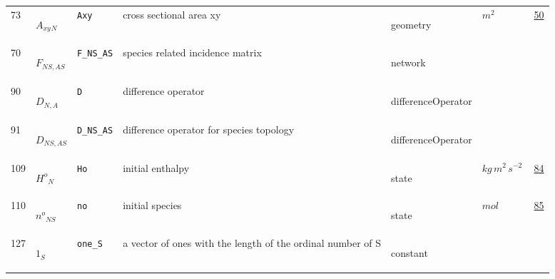 \begin{longtable}{|p{1cm}|p{2.5cm}|p{4.5cm}|p{8cm}|p{3.0cm}|p{3cm}|p{1cm}|}
            73
             & \hypertarget{"v:73"}{ $ {{A_{xy}}}{_{N}} $}
             & \verb|Axy|
             & cross sectional area xy
             & \begin{lay}geometry \end{lay}
             & $ m^{2} \, $
             &                 \hyperlink{"e:50"}{ 50 }
                 \\
            70
             & \hypertarget{"v:70"}{ $ {F}{_{{N S}, {A S}}} $}
             & \verb|F_NS_AS|
             & species related incidence matrix
             & \begin{lay}network \end{lay}
             & $  $
             & \\
            90
             & \hypertarget{"v:90"}{ $ {D}{_{N, A}} $}
             & \verb|D|
             & difference operator
             & \begin{lay}differenceOperator \end{lay}
             & $  $
             & \\
            91
             & \hypertarget{"v:91"}{ $ {D}{_{{N S}, {A S}}} $}
             & \verb|D_NS_AS|
             & difference operator for species topology
             & \begin{lay}differenceOperator \end{lay}
             & $  $
             & \\
            109
             & \hypertarget{"v:109"}{ $ {{H^o}}{_{N}} $}
             & \verb|Ho|
             & initial enthalpy
             & \begin{lay}state \end{lay}
             & $ kg \,m^{2} \,s^{-2} \, $
             &                 \hyperlink{"e:84"}{ 84 }
                 \\
            110
             & \hypertarget{"v:110"}{ $ {{n^o}}{_{{N S}}} $}
             & \verb|no|
             & initial species
             & \begin{lay}state \end{lay}
             & $ mol \, $
             &                 \hyperlink{"e:85"}{ 85 }
                 \\
            127
             & \hypertarget{"v:127"}{ $ {{1}}{_{S}} $}
             & \verb|one_S|
             & a vector of ones with the length of the ordinal number of S
             & \begin{lay}constant \end{lay}
             & $  $

\end{longtable}
